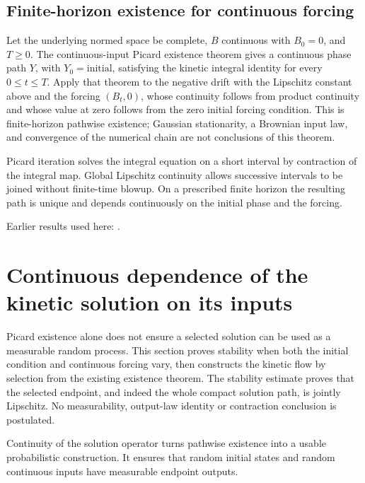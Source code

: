\documentclass[11pt,a4paper]{report}
\begin{document}
\subsection{\texorpdfstring{Finite-horizon existence for continuous forcing}{Finite-horizon existence for continuous forcing}}
\label{report-step-KineticLangevin-Dynamics-lean-3}


Let the underlying normed space be complete, \(B\) continuous with \(B_0=0\), and \(T\ge0\). The continuous-input Picard existence theorem gives a continuous phase path \(Y\), with \(Y_0=\text{initial}\), satisfying the kinetic integral identity for every \(0\le t\le T\). Apply that theorem to the negative drift with the Lipschitz constant above and the forcing \((B_t,0)\), whose continuity follows from product continuity and whose value at zero follows from the zero initial forcing condition. This is finite-horizon pathwise existence; Gaussian stationarity, a Brownian input law, and convergence of the numerical chain are not conclusions of this theorem.



Picard iteration solves the integral equation on a short interval by contraction of the integral map. Global Lipschitz continuity allows successive intervals to be joined without finite-time blowup. On a prescribed finite horizon the resulting path is unique and depends continuously on the initial phase and the forcing.



Earlier results used here: \cite[Section~3.14.3]{LangevinLean2026ULASC}.
\section{\texorpdfstring{Continuous dependence of the kinetic solution on its inputs}{Continuous dependence of the kinetic solution on its inputs}}
\label{proof-module-KineticLangevin-Flow-lean}


Picard existence alone does not ensure a selected solution can be used as a measurable random process. This section proves stability when both the initial condition and continuous forcing vary, then constructs the kinetic flow by selection from the existing existence theorem. The stability estimate proves that the selected endpoint, and indeed the whole compact solution path, is jointly Lipschitz. No measurability, output-law identity or contraction conclusion is postulated.



Continuity of the solution operator turns pathwise existence into a usable probabilistic construction. It ensures that random initial states and random continuous inputs have measurable endpoint outputs.
\end{document}
